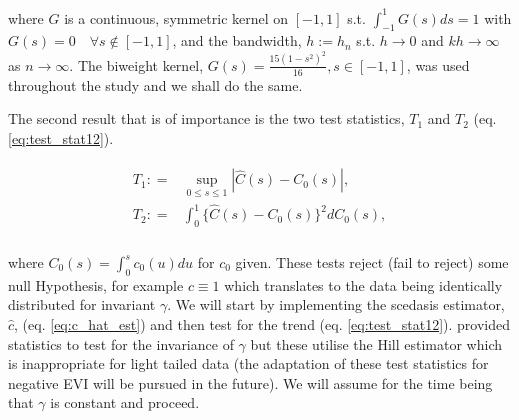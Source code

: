 \noindent where $G$ is a continuous, symmetric kernel on $[-1,1]$ s.t. $\int_{-1}^{1} G(s)ds = 1$ with $G(s) = 0 \quad \forall s \notin [-1,1]$, and the bandwidth, $h := h_n$ s.t. $h \rightarrow 0$ and $kh \rightarrow \infty$ as $n \rightarrow \infty$. The biweight kernel, $G(s) = \frac{15(1-s^2)^2}{16}, s \in [-1,1]$, was used throughout the study and we shall do the same.%

The second result that is of importance is the two test statistics, $T_1$ and $T_2$ (eq. \ref{eq:test_stat12}).  

\begin{align} \label{eq:test_stat12}
\begin{split}
T_1 : =& \sup_{0 \le s \le 1} |\hat{C}(s) - C_0(s)|,\\
T_2 : =& \int_0^1 \{\hat{C}(s) - C_0(s)\}^2 dC_0(s),\\
\end{split}
\end{align}

\noindent where $C_0(s) = \int_0^s c_0(u)du$ for $c_0$ given. These tests reject (fail to reject) some null Hypothesis, for example $c \equiv 1$ which translates to the data being identically distributed for invariant $\gamma$. We will start by implementing the scedasis estimator, $\hat{c}$, (eq. \ref{eq:c_hat_est}) and then test for the trend (eq. \ref{eq:test_stat12}). \cite{einmahl16} provided statistics to test for the invariance of $\gamma$ but these utilise the Hill estimator which is inappropriate for light tailed data (the adaptation of these test statistics for negative EVI will be pursued in the future). We will assume for the time being that $\gamma$ is constant and proceed.


%

